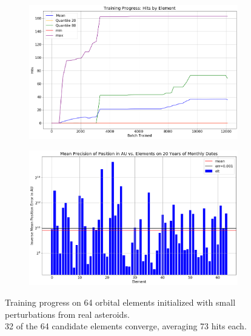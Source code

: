 \begin{figure}[h]
\begin{subfigure}[t]{\subfigwidth\textwidth}
\end{subfigure}
\hfill
\begin{subfigure}[t]{\subfigwidth\textwidth}
\centering
\includegraphics[width=\linewidth]{../figs/search_known/perturbed_small/learning_curve_hits.png}
\end{subfigure}
\medskip
\begin{subfigure}[t]{\textwidth}
\includegraphics[width=1.0\textwidth]{../figs/search_known/perturbed_small/near_ast_dist.png}
\end{subfigure}
\caption{Training progress on 64 orbital elements initialized with small perturbations from real asteroids.\\
32 of the 64 candidate elements converge, averaging 73 hits each.}
\end{figure}
\clearpage

